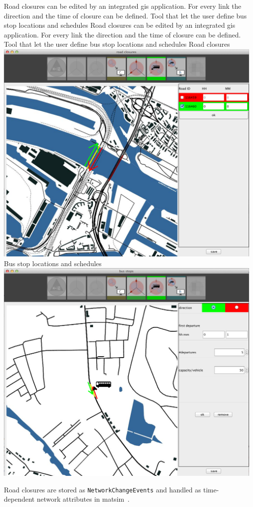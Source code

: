 \createfigure%
{Road closures can be edited by an integrated \gls{gis} application. For every link the direction and the time of closure can be defined. Tool that let the user define bus stop locations and schedules}%
{Road closures can be edited by an integrated \gls{gis} application. For every link the direction and the time of closure can be defined. Tool that let the user define bus stop locations and schedules}%
{\label{fig:evac_editor}}%
{%
  \createsubfigure%
  {Road closures}%
{\includegraphics[width=.475\linewidth]{extending/figures/Evacuation/rd_closure_detail}}
  {}%
  {}%
  \createsubfigure%
  {Bus stop locations and schedules}%
{\includegraphics[width=.475\linewidth]{extending/figures/Evacuation/bus_stops}}
  {}%
  {}%
}%
  {}%

Road closures are stored as \lstinline|NetworkChangeEvents| and handled as time-dependent network attributes in \gls{matsim}~\citep{LaemmelEtAl_TransResC_2010}.

